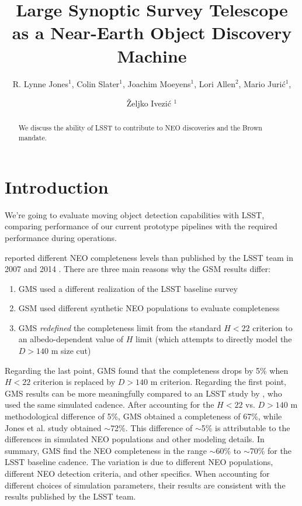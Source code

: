 \documentclass[12pt,preprint]{aastex}
\begin{document}
\title{Large Synoptic Survey Telescope as a Near-Earth Object Discovery Machine}

\author{R. Lynne Jones$^1$, Colin Slater$^1$, Joachim Moeyens$^1$, 
Lori Allen$^2$, Mario Juri\'{c}$^1$,  \and \v{Z}eljko Ivezi\'{c} $^1$}




\begin{abstract}
We discuss the ability of LSST to contribute to NEO discoveries and
the Brown mandate. 
\end{abstract}

\keywords{}

\section{Introduction}

We're going to evaluate moving object detection capabilities with
LSST, comparing performance of our current prototype pipelines with 
the required performance during operations.


\cite[hereafter GMS]{GMS2016} reported different NEO completeness levels than
published by the LSST team in 2007 and 2014 . There are three main 
reasons why the GSM results differ:
\begin{enumerate}
\item GMS used a different realization of the LSST baseline survey
\item GSM used different synthetic NEO populations to evaluate completeness
\item GMS {\it redefined} the completeness limit from the standard
  $H<22$ criterion to an albedo-dependent value of $H$ limit (which
  attempts to directly model the $D>140$ m size cut)
\end{enumerate}

Regarding the last point, GMS found that the completeness drops by 5\%
when $H<22$ criterion is replaced by $D>140$ m criterion. Regarding 
the first point, GMS results can be more meaningfully compared to an LSST
study by \cite{JJI2016}, who used the same simulated cadence. After accounting for 
the $H<22$ vs. $D>140$ m methodological difference of 5\%, GMS obtained a 
completeness of 67\%, while Jones et al. study obtained $\sim$72\%. This difference 
of $\sim$5\% is attributable to the differences in simulated NEO
populations and other modeling details. In summary, GMS find the NEO
completeness in the range $\sim$60\% to $\sim$70\% for the LSST
baseline cadence. The variation is due to different NEO populations,
different NEO detection criteria, and other specifics. When accounting 
for different choices of simulation parameters, their results are
consistent with the results published by the LSST team. 
\end{document}
